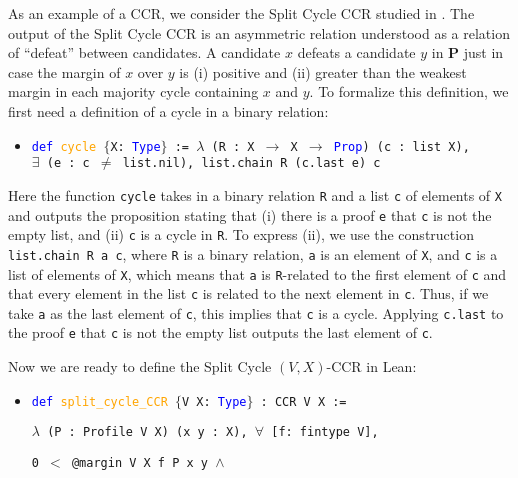 \documentclass[runningheads]{llncs}
\begin{document}
\begin{example}\label{SplitCycleEx1} As an example of a CCR, we consider the Split Cycle CCR studied in \cite{HP2020}. The output of the Split Cycle CCR is an asymmetric relation understood as a relation of ``defeat'' between candidates. A candidate $x$ defeats a candidate $y$ in $\mathbf{P}$ just in case the margin of $x$ over $y$ is (i) positive and (ii) greater than the weakest margin in each majority cycle containing $x$ and $y$. To formalize this definition, we first need a definition of a cycle in a binary relation:
\begin{itemize}
\item[] \texttt{\textcolor{blue}{def} \textcolor{orange}{cycle} $\{$X: \textcolor{blue}{Type}$\}$ := $\lambda$ (R : X $\to$ X $\to$ \textcolor{blue}{Prop}) (c : list X), \\
$\exists$ (e : c $\neq$ list.nil), list.chain R (c.last e) c}
\end{itemize}
Here the function \texttt{cycle} takes in a binary relation \texttt{R} and a list \texttt{c} of elements of \texttt{X} and outputs the proposition stating that (i) there is a proof \texttt{e} that \texttt{c} is not the empty list, and (ii) \texttt{c} is a cycle in \texttt{R}. To express (ii), we use the construction \texttt{list.chain R a c}, where \texttt{R} is a binary relation, \texttt{a} is an element of \texttt{X}, and \texttt{c} is a list of elements of \texttt{X}, which means that \texttt{a} is \texttt{R}-related to the first element of \texttt{c} and that every element in the list \texttt{c} is related to the next element in \texttt{c}. Thus, if we take \texttt{a} as the last element of \texttt{c}, this implies that \texttt{c} is a cycle. Applying \texttt{c.last} to the proof \texttt{e} that \texttt{c} is not the empty list outputs the last element of \texttt{c}.

Now we are ready to define the Split Cycle $(V,X)$-CCR in Lean:
\begin{itemize}
\item[] \texttt{\textcolor{blue}{def} \textcolor{orange}{split\_cycle\_CCR} $\{$V X: \textcolor{blue}{Type}$\}$ : CCR V X :=} 

    \texttt{$\lambda$ (P : Profile V X) (x y : X), $\forall$ [f: fintype V],}
    
    \texttt{0 $<$ @margin V X f P x y $\wedge$}
    

\end{itemize}
\end{example}
\end{document}
